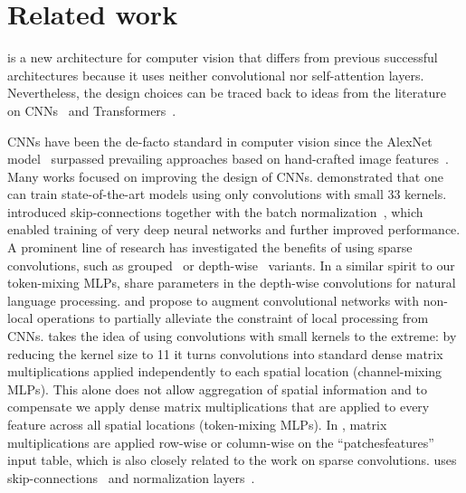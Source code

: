 \section{Related work}

\fullname{} is a new architecture for computer vision that differs from previous successful architectures because it uses neither convolutional nor self-attention layers. Nevertheless, the design choices can be traced back to ideas from the literature on  CNNs~\cite{KrizhevskyNIPS12,LeCun1989BackpropagationAT} and Transformers~\cite{vaswani2017}.

CNNs have been the de-facto standard in computer vision since the AlexNet model~\cite{KrizhevskyNIPS12} surpassed prevailing approaches based on hand-crafted image features~\cite{pinz2006object}.
Many works focused on improving the design of CNNs. 
\citet{simonyan2014very} demonstrated that one can train state-of-the-art models using only convolutions with small 33 kernels.
\citet{he2016deep} introduced skip-connections together with the batch normalization~\cite{ioffe2015batch}, which enabled training of very deep neural networks 
and further improved performance.
A prominent line of research has investigated the benefits of using sparse convolutions, such as grouped~\cite{Xie2016} or depth-wise~\cite{chollet2017xception,howard2017mobilenets} variants. 
In a similar spirit to our token-mixing MLPs, \citet{wu2019lightcnn} share parameters in the depth-wise convolutions for natural language processing.
\citet{hu2018squeeze} and \citet{wang2018-nonlocalnn} propose to augment convolutional networks with non-local operations to partially alleviate the constraint of local processing from CNNs.
\name{} takes the idea of using convolutions with small kernels to the extreme: by reducing the kernel size to 11 it 
turns convolutions into standard dense matrix multiplications applied independently to each spatial location (channel-mixing MLPs).
This 
alone does not allow aggregation of spatial information and to compensate we apply dense matrix multiplications that are applied to every feature across all spatial locations (token-mixing MLPs). 
In \name{}, matrix multiplications are applied row-wise or column-wise on the ``patchesfeatures'' input table, which is also closely related to the work on sparse convolutions. 
\name{} uses skip-connections~\cite{he2016deep} and normalization layers~\cite{ba2016layer,ioffe2015batch}.

